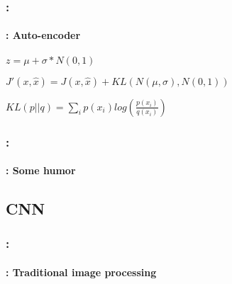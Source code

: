 \documentclass[xcolor=table]{beamer}
\begin{document}
\begin{frame}
	\frametitle{\insertshortsubtitle: \insertsection}
	\framesubtitle{\insertsubsection: Auto-encoder}
	
	\begin{minipage}{0.47\textwidth}
	\end{minipage}
	\hfill
	\begin{minipage}{0.47\textwidth} 
	\end{minipage}
	
	\begin{minipage}{0.52\textwidth}
		\small
		$ z = \mu + \sigma * N(0, 1) $
		
		\vspace{6pt}$ J'(x, \hat{x}) = J(x, \hat{x}) + KL(N(\mu, \sigma), N(0, 1)) $
		
		\vspace{6pt}$ KL(p||q) = \sum_i p(x_i) log(\frac{p(x_i)}{q(x_i)}) $
	\end{minipage}
	\begin{minipage}{0.47\textwidth} 
	\end{minipage}
	
	
\end{frame}

\begin{frame}
	\frametitle{\insertshortsubtitle: \insertsection}
	\framesubtitle{\insertsubsection: Some humor}
	
	\begin{center}
	\end{center}
	
\end{frame}


\subsection{CNN}

\begin{frame}
	\frametitle{\insertshortsubtitle: \insertsection}
	\framesubtitle{\insertsubsection: Traditional image processing}
	
	\begin{center}
	\end{center}
	
\end{frame}
\end{document}
